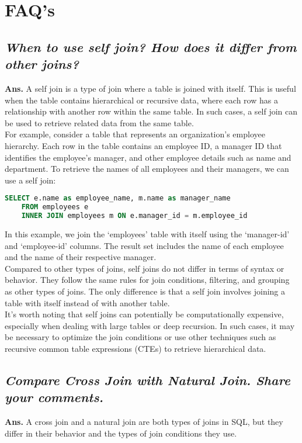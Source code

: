 \documentclass{article}
\begin{document}
\section{\textbf{FAQ's}}
\subsection{\textit{When to use self join? How does it differ from other joins?}}
\textbf{Ans.} A self join is a type of join where a table is joined with itself. This is useful when the table contains hierarchical or recursive data, where each row has a relationship with another row within the same table. In such cases, a self join can be used to retrieve related data from the same table.\\

For example, consider a table that represents an organization's employee hierarchy. Each row in the table contains an employee ID, a manager ID that identifies the employee's manager, and other employee details such as name and department. To retrieve the names of all employees and their managers, we can use a self join:
\begin{lstlisting}[language=SQL]
    SELECT e.name as employee_name, m.name as manager_name
    FROM employees e
    INNER JOIN employees m ON e.manager_id = m.employee_id

\end{lstlisting}
In this example, we join the `employees' table with itself using the `manager-id' and `employee-id' columns. The result set includes the name of each employee and the name of their respective manager.\\

Compared to other types of joins, self joins do not differ in terms of syntax or behavior. They follow the same rules for join conditions, filtering, and grouping as other types of joins. The only difference is that a self join involves joining a table with itself instead of with another table.\\

It's worth noting that self joins can potentially be computationally expensive, especially when dealing with large tables or deep recursion. In such cases, it may be necessary to optimize the join conditions or use other techniques such as recursive common table expressions (CTEs) to retrieve hierarchical data.
\subsection{\textit{Compare Cross Join with Natural Join. Share your comments.}}
\textbf{Ans.} A cross join and a natural join are both types of joins in SQL, but they differ in their behavior and the types of join conditions they use.
\end{document}
